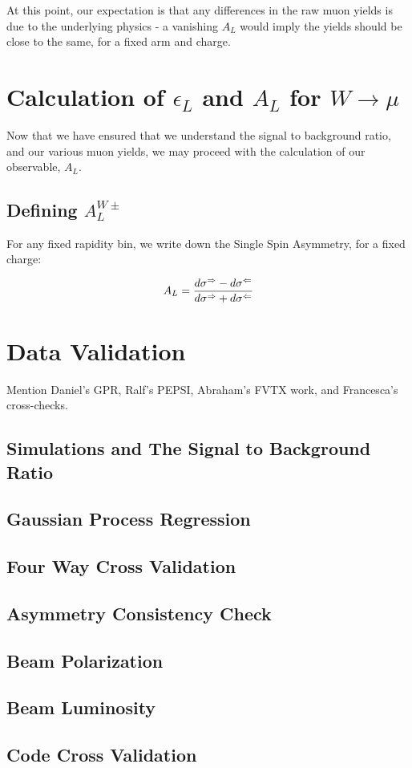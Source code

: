 At this point, our expectation is that any differences in the raw muon yields is
due to the underlying physics - a vanishing $A_L$ would imply the yields should
be close to the same, for a fixed arm and charge.

\clearpage
\section{Calculation of $\epsilon_L$ and $A_{L}$ for $W\rightarrow\mu$}

Now that we have ensured that we understand the signal to background ratio, and
our various muon yields, we may proceed with the calculation of our observable,
$A_L$. 

\subsection{Defining $A_L^{W\pm}$}
\label{sec:calculate_al}

For any fixed rapidity bin, we write down the Single Spin Asymmetry, for a
fixed charge:

\begin{equation}
  A_L = {
    {d\sigma^{\Rightarrow} - d\sigma^{\Leftarrow}}
    \over
    {d\sigma^{\Rightarrow} + d\sigma^{\Leftarrow}}
  }
\end{equation}

\section{Data Validation}
Mention Daniel's GPR, Ralf's PEPSI, Abraham's FVTX work, and Francesca's cross-checks.
\subsection{Simulations and The Signal to Background Ratio}
\subsection{Gaussian Process Regression}
\subsection{Four Way Cross Validation}
\subsection{Asymmetry Consistency Check}
\subsection{Beam Polarization}
\subsection{Beam Luminosity}
\subsection{Code Cross Validation}
